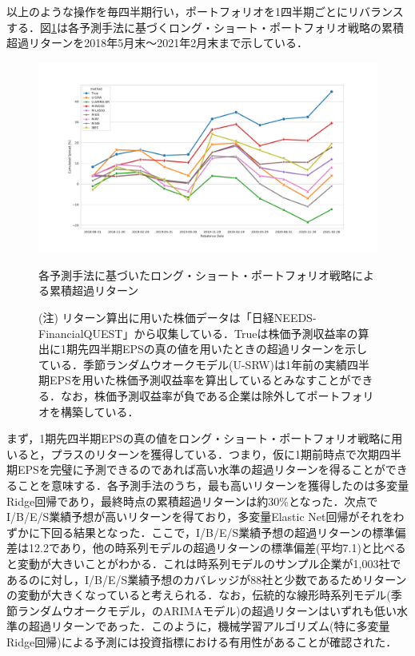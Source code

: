 \documentclass[a4paper，12pt]{jsarticle}
\begin{document}
以上のような操作を毎四半期行い，ポートフォリオを1四半期ごとにリバランスする．図\ref{fig:portfolio_return}は各予測手法に基づくロング・ショート・ポートフォリオ戦略の累積超過リターンを2018年5月末～2021年2月末まで示している．

\begin{figure}[htbp]
  \centering
  \includegraphics[width=15cm]{./img/_portfolio_return.pdf}
  \caption{各予測手法に基づいたロング・ショート・ポートフォリオ戦略による累積超過リターン}
  \label{fig:portfolio_return}
  \caption*{(注) リターン算出に用いた株価データは「日経NEEDS-FinancialQUEST」から収集している．Trueは株価予測収益率の算出に1期先四半期EPSの真の値を用いたときの超過リターンを示している．季節ランダムウオークモデル(U-SRW)は1年前の実績四半期EPSを用いた株価予測収益率を算出しているとみなすことができる．なお，株価予測収益率が負である企業は除外してポートフォリオを構築している．}
\end{figure}

まず，1期先四半期EPSの真の値をロング・ショート・ポートフォリオ戦略に用いると，プラスのリターンを獲得している．つまり，仮に1期前時点で次期四半期EPSを完璧に予測できるのであれば高い水準の超過リターンを得ることができることを意味する．各予測手法のうち，最も高いリターンを獲得したのは多変量Ridge回帰であり，最終時点の累積超過リターンは約30\%となった．次点でI/B/E/S業績予想が高いリターンを得ており，多変量Elastic Net回帰がそれをわずかに下回る結果となった．ここで，I/B/E/S業績予想の超過リターンの標準偏差は12.2であり，他の時系列モデルの超過リターンの標準偏差(平均7.1)と比べると変動が大きいことがわかる．これは時系列モデルのサンプル企業が1,003社であるのに対し，I/B/E/S業績予想のカバレッジが88社と少数であるためリターンの変動が大きくなっていると考えられる．なお，伝統的な線形時系列モデル(季節ランダムウオークモデル，\cite{brown1979univariate}のARIMAモデル)の超過リターンはいずれも低い水準の超過リターンであった．このように，機械学習アルゴリズム(特に多変量Ridge回帰)による予測には投資指標における有用性があることが確認された．
\end{document}

